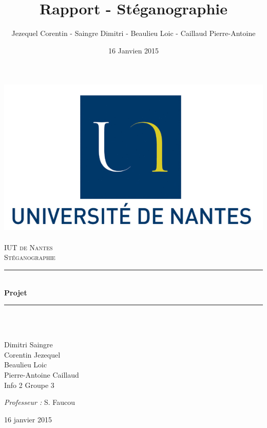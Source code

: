 \documentclass[a4paper, titlepage]{report}
\title{Rapport - Stéganographie}      %
\author{Jezequel Corentin - Saingre Dimitri - Beaulieu Loic - Caillaud Pierre-Antoine}%
\date{16 Janvien 2015}           %
\newcommand{\HRule}{\rule{\linewidth}{0.5mm}}
\begin{document}
\begin{titlepage}
  \begin{sffamily}
  \begin{center}

    \includegraphics[scale=1]{univnantes.png}~\\[1.5cm]

    \textsc{\LARGE IUT de Nantes}\\[2cm]

    \textsc{\LargeRapport Stéganographie}\\[1.5cm]

    \HRule \\[0.4cm]
    { \huge \bfseries Projet \\[0.4cm] }

    \HRule \\[2cm]
    
    \\[2cm]

    \begin{minipage}{0.4\textwidth}
      \begin{flushleft} \large
        Dimitri Saingre\\
        Corentin Jezequel\\
        Beaulieu Loic\\
        Pierre-Antoine Caillaud\\
        Info 2 Groupe 3\\
      \end{flushleft}
    \end{minipage}
    \begin{minipage}{0.4\textwidth}
      \begin{flushleft} \large
        \emph{Professeur :} S. Faucou
      \end{flushleft}
    \end{minipage}

    \vfill

    {\large 16 janvier 2015}


  \end{center}
  \end{sffamily}
\end{titlepage}
\end{document}
